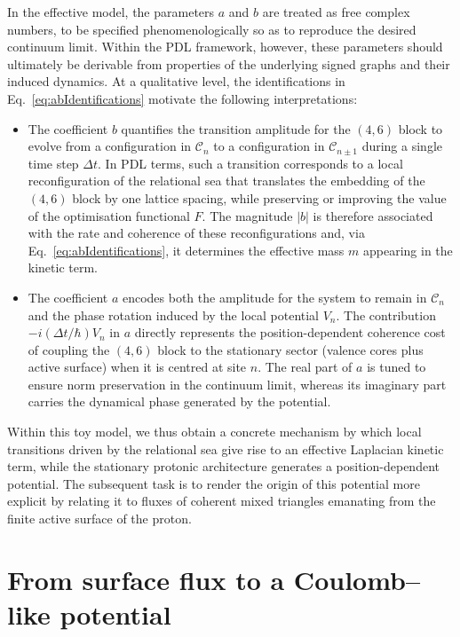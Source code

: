 \documentclass[11pt,a4paper]{article}
\begin{document}
In the effective model, the parameters $a$ and $b$ are treated as free complex numbers, to be specified phenomenologically so as to reproduce the desired continuum limit. Within the PDL framework, however, these parameters should ultimately be derivable from properties of the underlying signed graphs and their induced dynamics. At a qualitative level, the identifications in Eq.~\eqref{eq:abIdentifications} motivate the following interpretations:
\begin{itemize}
\item The coefficient $b$ quantifies the transition amplitude for the $(4,6)$ block to evolve from a configuration in $\mathcal{C}_n$ to a configuration in $\mathcal{C}_{n\pm 1}$ during a single time step $\Delta t$. In PDL terms, such a transition corresponds to a local reconfiguration of the relational sea that translates the embedding of the $(4,6)$ block by one lattice spacing, while preserving or improving the value of the optimisation functional $F$. The magnitude $|b|$ is therefore associated with the rate and coherence of these reconfigurations and, via Eq.~\eqref{eq:abIdentifications}, it determines the effective mass $m$ appearing in the kinetic term.
\item The coefficient $a$ encodes both the amplitude for the system to remain in $\mathcal{C}_n$ and the phase rotation induced by the local potential $V_n$. The contribution $-i(\Delta t/\hbar)V_n$ in $a$ directly represents the position-dependent coherence cost of coupling the $(4,6)$ block to the stationary sector (valence cores plus active surface) when it is centred at site $n$. The real part of $a$ is tuned to ensure norm preservation in the continuum limit, whereas its imaginary part carries the dynamical phase generated by the potential.
\end{itemize}
Within this toy model, we thus obtain a concrete mechanism by which local transitions driven by the relational sea give rise to an effective Laplacian kinetic term, while the stationary protonic architecture generates a position-dependent potential. The subsequent task is to render the origin of this potential more explicit by relating it to fluxes of coherent mixed triangles emanating from the finite active surface of the proton.

\section{From surface flux to a Coulomb--like potential}
\label{sec:FluxPotential}
\end{document}
